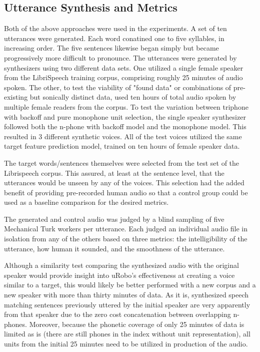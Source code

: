 \documentclass[10pt, journal, compsoc]{IEEEtran}
\begin{document}
\subsection{Utterance Synthesis and Metrics}
Both of the above approaches were used in the experiments. A set of ten utterances were generated. Each word conatined one to five syllables, in increasing order. The five sentences likewise began simply but became progressively more difficult to pronounce. The utterances were generated by synthesizers using two different data sets. One utilized a single female speaker from the LibriSpeech training corpus, comprising roughly 25 minutes of audio spoken. The other, to test the viability of "found data" or combinations of pre-existing but sonically distinct data, used ten hours of total audio spoken by multiple female readers from the corpus. To test the variation between triphone with backoff and pure monophone unit selection, the single speaker synthesizer followed both the n-phone with backoff model and the monophone model. This resulted in 3 different synthetic voices. All of the test voices utilized the same target feature prediction model, trained on ten hours of female speaker data.\par 
The target words/sentences themselves were selected from the test set of the Librispeech corpus. This assured, at least at the sentence level, that the utterances would be unseen by any of the voices. This selection had the added benefit of providing pre-recorded human audio so that a control group could be used as a baseline comparison for the desired metrics. \par
The generated and control audio was judged by a blind sampling of five Mechanical Turk workers per utterance. Each judged an individual audio file in isolation from any of the others based on three metrics: the intelligibility of the utterance, how human it sounded, and the smoothness of the utterance.\par
Although a similarity test comparing the synthesized audio with the original speaker would provide insight into uRobo's effectiveness at creating a voice similar to a target, this would likely be better performed with a new corpus and a new speaker with more than thirty minutes of data. As it is, synthesized speech matching sentences previously uttered by the initial speaker are very apparently from that speaker due to the zero cost concatenation between overlapping n-phones. Moreover, because the phonetic coverage of only 25 minutes of data is limited as is (there are still phones in the index without unit representation), all units from the initial 25 minutes need to be utilized in production of the audio.
\end{document}

